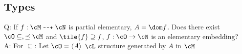 
\subsection{Types}

Q: If $f: \cM \dashrightarrow \cN$ is partial elementary, $A = \dom f$. Does there exist $\cO \subseteq, \preceq \cM$ and $\tile{f} \supseteq f$, $\tilde{f} : \cO \to \cN$ is an elementary embedding? \\ 
A: For $\subseteq$: Let $\cO = \langle A \rangle$ $\cL$ structure generated by $A$ in $\cM$ 